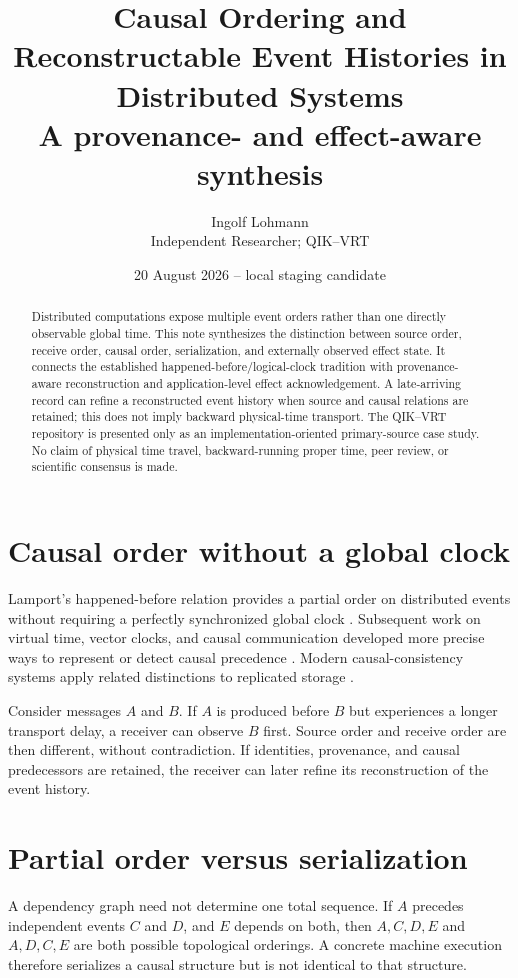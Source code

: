 \documentclass[11pt]{article}
\title{Causal Ordering and Reconstructable Event Histories in Distributed Systems\\\large A provenance- and effect-aware synthesis}
\author{Ingolf Lohmann\\Independent Researcher; QIK--VRT}
\date{20 August 2026 -- local staging candidate}
\begin{document}
\maketitle
\begin{abstract}
Distributed computations expose multiple event orders rather than one directly observable global time. This note synthesizes the distinction between source order, receive order, causal order, serialization, and externally observed effect state. It connects the established happened-before/logical-clock tradition with provenance-aware reconstruction and application-level effect acknowledgement. A late-arriving record can refine a reconstructed event history when source and causal relations are retained; this does not imply backward physical-time transport. The QIK--VRT repository is presented only as an implementation-oriented primary-source case study. No claim of physical time travel, backward-running proper time, peer review, or scientific consensus is made.
\end{abstract}

\section{Causal order without a global clock}
Lamport's happened-before relation provides a partial order on distributed events without requiring a perfectly synchronized global clock \cite{Lamport1978}. Subsequent work on virtual time, vector clocks, and causal communication developed more precise ways to represent or detect causal precedence \cite{Mattern1989,SchwarzMattern1994,CharronBost1996}. Modern causal-consistency systems apply related distinctions to replicated storage \cite{Freitas2025}.

Consider messages $A$ and $B$. If $A$ is produced before $B$ but experiences a longer transport delay, a receiver can observe $B$ first. Source order and receive order are then different, without contradiction. If identities, provenance, and causal predecessors are retained, the receiver can later refine its reconstruction of the event history.

\section{Partial order versus serialization}
A dependency graph need not determine one total sequence. If $A$ precedes independent events $C$ and $D$, and $E$ depends on both, then $A,C,D,E$ and $A,D,C,E$ are both possible topological orderings. A concrete machine execution therefore serializes a causal structure but is not identical to that structure.
\end{document}

